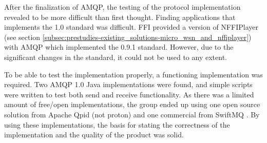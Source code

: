 After the finalization of AMQP, the testing of the protocol implementation revealed to be more difficult than first thought. Finding applications that implements the 1.0 standard was difficult. FFI provided a version of NFFIPlayer (see section \ref{subsec:prestudies-existing_solutions-micro_wsn_and_nffiplayer}) with AMQP which implemented the 0.9.1 standard. However, due to the significant changes in the standard, it could not be used to any extent.

To be able to test the implementation properly, a functioning implementation was required. Two AMQP 1.0 Java implementations were found, and simple scripts were written to test both send and receive functionality. As there was a limited amount of free/open implementations, the group ended up using one open source solution from Apache Qpid (not proton) \cite{apache-qpid} and one commercial from SwiftMQ \cite{swift-mq}. By using these implementations, the basis for stating the correctness of the implementation and the quality of the product was solid.

\clearpage